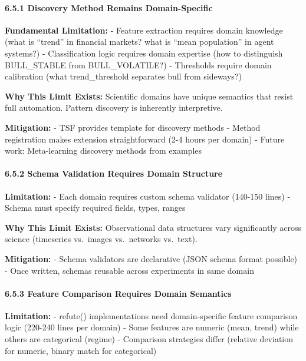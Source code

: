 \documentclass[
]{article}
\begin{document}
\paragraph{6.5.1 Discovery Method Remains
Domain-Specific}\label{discovery-method-remains-domain-specific}

\textbf{Fundamental Limitation:} - Feature extraction requires domain
knowledge (what is ``trend'' in financial markets? what is ``mean
population'' in agent systems?) - Classification logic requires domain
expertise (how to distinguish BULL\_STABLE from BULL\_VOLATILE?) -
Thresholds require domain calibration (what trend\_threshold separates
bull from sideways?)

\textbf{Why This Limit Exists:} Scientific domains have unique semantics
that resist full automation. Pattern discovery is inherently
interpretive.

\textbf{Mitigation:} - TSF provides template for discovery methods -
Method registration makes extension straightforward (2-4 hours per
domain) - Future work: Meta-learning discovery methods from examples

\paragraph{6.5.2 Schema Validation Requires Domain
Structure}\label{schema-validation-requires-domain-structure}

\textbf{Limitation:} - Each domain requires custom schema validator
(140-150 lines) - Schema must specify required fields, types, ranges

\textbf{Why This Limit Exists:} Observational data structures vary
significantly across science (timeseries vs.~images vs.~networks
vs.~text).

\textbf{Mitigation:} - Schema validators are declarative (JSON schema
format possible) - Once written, schemas reusable across experiments in
same domain

\paragraph{6.5.3 Feature Comparison Requires Domain
Semantics}\label{feature-comparison-requires-domain-semantics}

\textbf{Limitation:} - refute() implementations need domain-specific
feature comparison logic (220-240 lines per domain) - Some features are
numeric (mean, trend) while others are categorical (regime) - Comparison
strategies differ (relative deviation for numeric, binary match for
categorical)
\end{document}
